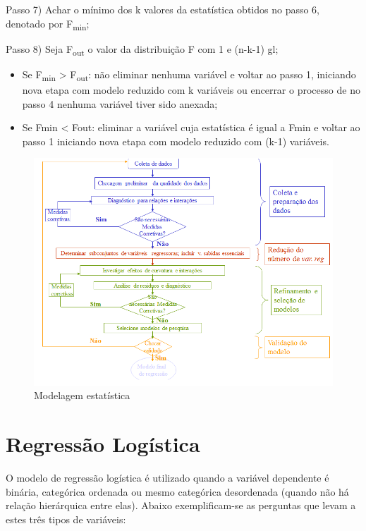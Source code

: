 \documentclass[12pt,brazil,]{book}
\begin{document}
Passo 7) Achar o mínimo dos k valores da estatística obtidos no passo 6,
denotado por F\textsubscript{min};

Passo 8) Seja F\textsubscript{out} o valor da distribuição F com 1 e
(n-k-1) gl;

\begin{itemize}
\item
  Se F\textsubscript{min} \textgreater{} F\textsubscript{out}: não
  eliminar nenhuma variável e voltar ao passo 1, iniciando nova etapa
  com modelo reduzido com k variáveis ou encerrar o processo de no passo
  4 nenhuma variável tiver sido anexada;
\item
  Se Fmin \textless{} Fout: eliminar a variável cuja estatística é igual
  a Fmin e voltar ao passo 1 iniciando nova etapa com modelo reduzido
  com (k-1) variáveis.
\end{itemize}

\begin{figure}
\centering
\includegraphics{regress1.png}
\caption{Modelagem estatística}
\end{figure}

\printbibliography[segment=\therefsegment,heading=subbibliography]

\hypertarget{regressao-logistica}{%
\chapter{Regressão Logística}\label{regressao-logistica}}

O modelo de regressão logística é utilizado quando a variável dependente
é binária, categórica ordenada ou mesmo categórica desordenada (quando
não há relação hierárquica entre elas). Abaixo exemplificam-se as
perguntas que levam a estes três tipos de variáveis:
\end{document}
